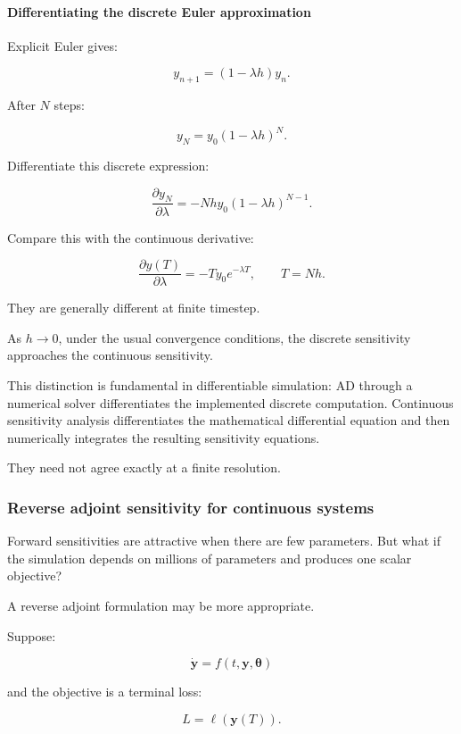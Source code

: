 \paragraph{Differentiating the discrete Euler approximation}\label{02-foundations-ii-ch022-differentiating-the-discrete-euler-approximation}

Explicit Euler gives:

\[
y_{n+1}=(1-\lambda h)y_n.
\]

After \(N\) steps:

\[
y_N=y_0(1-\lambda h)^N.
\]

Differentiate this discrete expression:

\[
\boxed{ \frac{\partial y_N}{\partial\lambda} = -Nhy_0(1-\lambda h)^{N-1} }.
\]

Compare this with the continuous derivative:

\[
\frac{\partial y(T)}{\partial\lambda} = -Ty_0e^{-\lambda T}, \qquad T=Nh.
\]

They are generally different at finite timestep.

As \(h\to0\), under the usual convergence conditions, the discrete sensitivity approaches the continuous sensitivity.

This distinction is fundamental in differentiable simulation: AD through a numerical solver differentiates the implemented discrete computation. Continuous sensitivity analysis differentiates the mathematical differential equation and then numerically integrates the resulting sensitivity equations.

They need not agree exactly at a finite resolution.

\subsubsection{Reverse adjoint sensitivity for continuous systems}\label{02-foundations-ii-ch022-reverse-adjoint-sensitivity-for-continuous-systems}

Forward sensitivities are attractive when there are few parameters. But what if the simulation depends on millions of parameters and produces one scalar objective?

A reverse adjoint formulation may be more appropriate.

Suppose:

\[
\dot{\mathbf y}=f(t,\mathbf y,\boldsymbol\theta)
\]

and the objective is a terminal loss:

\[
L=\ell(\mathbf y(T)).
\]

